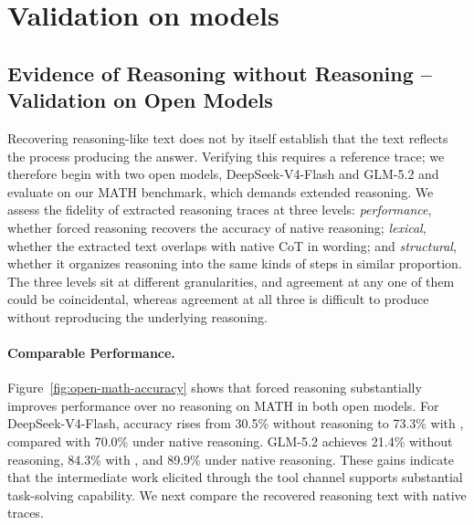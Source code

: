 \appendix



\section{Validation on models}
\subsection{Evidence of Reasoning without Reasoning -- Validation on Open Models}
\label{sec:open-evidence}
Recovering reasoning-like text does not by itself establish that the text reflects the process producing the answer. Verifying this requires a reference trace; we therefore begin with two open models,
DeepSeek-V4-Flash \citep{deepseekai2026deepseekv4} and GLM-5.2\citep{glm5team2026glm5vibecodingagentic} and evaluate on our MATH benchmark, which demands extended reasoning.  We assess the fidelity of extracted reasoning traces at three levels: \emph{performance}, whether forced reasoning recovers the accuracy of native reasoning; \emph{lexical}, whether the extracted text overlaps with native CoT in wording; and \emph{structural}, whether it organizes reasoning into the same kinds of steps in similar proportion. The three levels sit at different granularities, and agreement at any one of them could be coincidental, whereas agreement at all three is difficult to produce without reproducing the underlying reasoning. 

\paragraph{Comparable Performance.} 

Figure~\ref{fig:open-math-accuracy} shows that forced reasoning substantially improves performance over no reasoning on MATH in both open models.
For DeepSeek-V4-Flash, accuracy rises from 30.5\% without reasoning to 73.3\% with \method{}, compared with 70.0\% under native reasoning.
GLM-5.2 achieves 21.4\% without reasoning, 84.3\% with \method{}, and 89.9\% under native reasoning.
These gains indicate that the intermediate work elicited through the tool channel supports substantial task-solving capability.
We next compare the recovered reasoning text with native traces.

